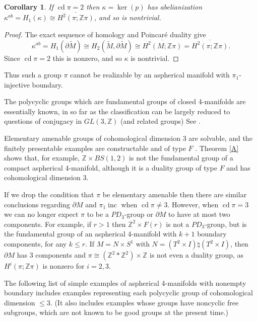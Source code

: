 \documentclass[12pt]{amsart}
\renewcommand{\leq}{\leqslant}
\newtheorem{corollary}[theorem]{Corollary}
\theoremstyle{definition}
\newcommand{\Z}{\mathbb Z}
\DeclareMathOperator{\cd}{cd}
\DeclareMathOperator{\inc}{inc}
\begin{document}
\begin{corollary}
\label{cd2kernel}
If $\cd \pi=2$ then $\kappa=\ker(p)$ has abelianization
$\kappa^{ab}=H_1(\kappa)\cong\overline{H^2(\pi;\Z\pi)}$, and so is nontrivial.
\end{corollary}

\begin{proof}
The exact sequence of homology and Poincar\'e duality give
\[\kappa^{ab}=H_1(\partial\widetilde{M})\cong
{H_2(\widetilde{M},\partial\widetilde{M})}
\cong\overline{H^2(M;\mathbb{Z}\pi)}=\overline{H^2(\pi;\mathbb{Z}\pi)}.
\]
Since $\cd\pi=2$ this is nonzero, and so $\kappa$ is nontrivial.\end{proof}

Thus such a group $\pi$ cannot be realizable by an aspherical manifold with $\pi_1$-injective boundary.

The polycyclic groups which are fundamental groups of closed 4-manifolds
are essentially known, 
in so far as the classification can be largely reduced to
questions of conjugacy in $GL(3,\mathbb{Z})$ (and related groups) 
See \cite[Chapter 8]{HiF}.

Elementary amenable groups of cohomological dimension 3 are solvable, 
and the finitely presentable examples are constructable and of 
 type $F$ \cite{Hi24}.
Theorem \ref{A} shows that, for example, 
$\Z \times BS(1,2)$ is not the fundamental group of a compact aspherical 4-manifold,
although it is a duality group of type $F$ and has cohomological dimension 3.
 
If we drop the condition that $\pi$ be elementary amenable then 
there are similar conclusions regarding $\partial{M}$
and $\pi_1\inc$ when $\cd \pi\not=3$.
However, when $\cd\pi=3$ we can no longer expect $\pi$ to be 
a $PD_3$-group or $\partial{M}$ to have at most two components.
For example, if $r>1$ then $\Z^2\times{F(r)}$ is not a $PD_3$-group,
but is the fundamental group of an aspherical 4-manifold with 
$k+1$ boundary components, for any $k\leq{r}$.
If $M=N \times{S^1}$ with $N = (T^2\times{I})\natural(T^2\times{I})$,
then $\partial{M}$ has 3 components and
$\pi\cong(\mathbb{Z}^2*\mathbb{Z}^2)\times\mathbb{Z}$ is not even a duality group, 
as $H^i(\pi;\mathbb{Z}\pi)$ is nonzero for $i=2,3$.

The following list of simple examples of aspherical 4-manifolds 
with nonempty boundary includes examples representing each
polycyclic group of cohomological dimension $\leq3$.
(It also includes examples whose groups have noncyclic free subgroups, 
which are not known to be good groups at the present time.)
\end{document}
